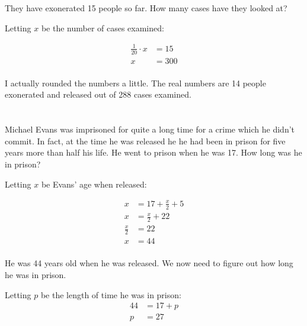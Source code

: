 \documentclass[letterpaper, landscape]{exam}
\begin{document}
\begin{questions}
      \begin{parts}

        \part{} They have exonerated 15 people so far.  How many cases have
        they looked at?
          \begin{solution}
            Letting $x$ be the number of cases examined:

            \begin{align*}
              \frac{1}{20} \cdot x & = 15 \\
              x                    & = 300 \\
            \end{align*}

            I actually rounded the numbers a little.  The real numbers are 14
            people exonerated and released out of 288 cases examined.

          \end{solution}

        \part{}
          Michael Evans was imprisoned for quite a long time for a crime which
          he didn't commit.  In fact, at the time he was released he he had
          been in prison for five years more than half his life. He went to
          prison when he was 17.  How long was he in prison? 

          \begin{solution}
            Letting $x$ be Evans' age when released:

            \begin{align*}
              x           & = 17 + \frac{x}{2} + 5 \\
              x           & = \frac{x}{2} + 22 \\
              \frac{x}{2} & = 22 \\
              x           & = 44 \\
            \end{align*}

            He was 44 years old when he was released.  We now need to figure
            out how long he was in prison. 

            Letting $p$ be the length of time he was in prison:
            \begin{align*}
              44 & = 17 + p \\
              p  & = 27 \\
            \end{align*}


\end{solution}
\end{parts}
\end{questions}
\end{document}
